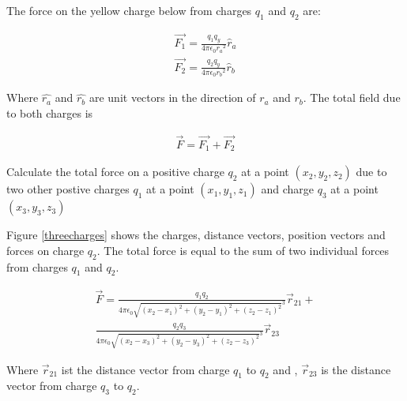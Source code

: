 \documentclass{ximera}
\begin{document}
The force on the yellow charge below from charges $q_1$ and $q_2$ are:

\begin{eqnarray}
\vec{F_1}=\frac{q_1 q_y}{4 \pi \epsilon_{0} {r_a}^2} \hat{r}_a \label{field}\\
\vec{F_2}=\frac{q_2 q_y}{4 \pi \epsilon_{0} {r_b}^2} \hat{r}_b
\end{eqnarray}

Where $\hat{r_a}$ and $\hat{r_b}$ are unit vectors in the direction of $r_a$ and $r_b$. The total field due to both charges is


\begin{eqnarray}
\vec{F}=\vec{F_1} + \vec{F_2} 
\end{eqnarray}




\begin{example}

Calculate the total force on a positive charge $q_2$ at a point $(x_2,y_2,z_2)$ due to two other postive charges $q_1$ at a point $(x_1,y_1,z_1)$ and charge $q_3$ at a point $(x_3,y_3,z_3)$


\begin{explanation}



Figure \ref{threecharges} shows the charges, distance vectors, position vectors and forces on charge $q_2$. The total force is equal to the sum of two individual forces from charges $q_1$ and $q_2$.

\begin{eqnarray}
\vec{F}= \frac{q_1 q_2}{4 \pi \epsilon_{0} {\sqrt{(x_2 - x_1)^2 +(y_2 - y_1)^2 +  (z_2 - z_1)^2}^3}} \vec{r}_{21} + \\ \nonumber
 \frac{q_2 q_3}{4 \pi \epsilon_{0} {\sqrt{(x_2 - x_3)^2 +(y_2 - y_3)^2 +(z_2 - z_3)^2}
}^3} \vec{r}_{23} 
\end{eqnarray}

Where $\vec{r}_{21}$ ist the distance vector from charge $q_1$ to $q_2$ and , $\vec{r}_{23}$ is the distance vector from charge $q_3$ to $q_2$.


\end{explanation}
\end{example}
\end{document}
